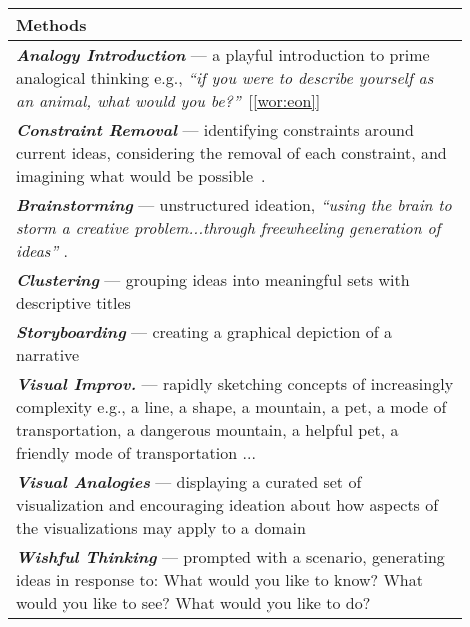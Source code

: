 \begin{table}
    \small
    \centering
    \begin{tabular}{|m{0.9\linewidth}|}
        \hline
        \textbf{Methods} \\
        \hline
        \textbf{\emph{Analogy Introduction}} --- a playful introduction to prime analogical thinking e.g., \emph{``if you were to describe yourself as an animal, what would you be?''}~[\ref{wor:eon}] \\
        \hline
        \textbf{\emph{Constraint Removal}} --- identifying constraints around current ideas, considering the removal of each constraint, and imagining  what would be possible~\cite{Jones2008}. \\ 
        \hline
        \textbf{\emph{Brainstorming}} --- unstructured ideation, \emph{``using the \emph{brain} to \emph{storm} a creative problem...through freewheeling generation of ideas''} \cite{Osborn1953}. \\
        \hline
        \textbf{\emph{Clustering}} --- grouping ideas into meaningful sets with descriptive titles\\
        \hline
        \textbf{\emph{Storyboarding}} --- creating a graphical depiction of a narrative ~\cite{Truong2006}\\
        \hline
        \textbf{\emph{Visual Improv.}} --- rapidly sketching concepts of increasingly complexity e.g., a line, a shape, a mountain, a pet, a mode of transportation, a dangerous mountain, a helpful pet, a friendly mode of transportation ... \\ 
        \hline
        \textbf{\emph{Visual Analogies}} --- displaying a curated set of visualization and encouraging ideation about how aspects of the visualizations may apply to a domain~\cite{Koh2011} \\
        \hline
        \textbf{\emph{Wishful Thinking}} --- prompted with a scenario, generating ideas in response to: What would you like to know? What would you like to see? What would you like to do? \\
        \hline
    \end{tabular}
    \caption{}
    \label{tab:methods}
\end{table}

